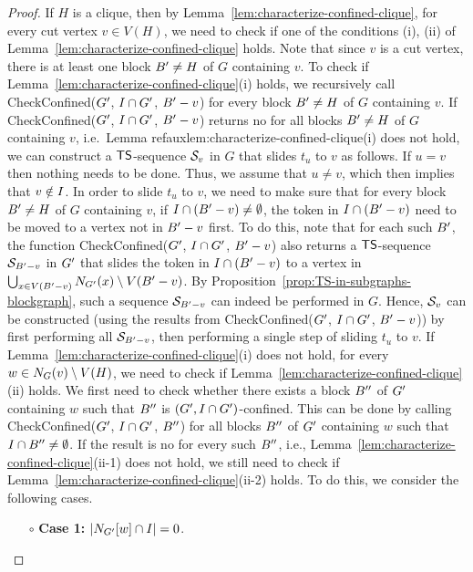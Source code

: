 \documentclass[a4paper]{llncs}
\begin{document}
\begin{proof}
If $H$ is a clique, then by Lemma~\ref{lem:characterize-confined-clique}, 
	for every cut vertex $v \in V(H)$,
	we need to check if one of the conditions (i), (ii) of Lemma~\ref{lem:characterize-confined-clique} holds.
Note that since $v$ is a cut vertex, there is at least one block $B^{\prime} \neq H$ of $G$ containing $v$.
To check if Lemma~\ref{lem:characterize-confined-clique}(i) holds, we recursively call {\sc CheckConfined}(${G^\prime}$, $I \cap {G^\prime}$, $B^{\prime} - v$) for every block $B^{\prime} \neq H$ of $G$ containing $v$.
If {\sc CheckConfined}(${G^\prime}$, $I \cap {G^\prime}$, $B^{\prime} - v$) returns {\sc no} for all blocks $B^{\prime} \neq H$ of $G$ containing $v$, i.e.~Lemma refaux{lem:characterize-confined-clique}(i) does not hold, 
	we can construct a ${\sf TS}$-sequence ${\cal S}_v$ in $G$ that slides $t_u$ to $v$ as follows.
If $u = v$ then nothing needs to be done.
Thus, we assume that $u \neq v$, which then implies that $v \notin I$.
In order to slide $t_u$ to $v$, we need to make sure that for every block $B^{\prime} \neq H$ of $G$ containing $v$, if $I \cap (B^{\prime} - v) \neq \emptyset$, 
	the token in $I \cap (B^{\prime} - v)$ need to be moved to a vertex not in $B^{\prime} - v$ first.
To do this, note that for each such $B^{\prime}$, the function {\sc CheckConfined}(${G^\prime}$, $I \cap {G^\prime}$, $B^{\prime} - v$) also returns a ${\sf TS}$-sequence ${\cal S}_{B^{\prime} - v}$ in ${G^\prime}$ that slides the token in $I \cap (B^{\prime} - v)$ to a vertex in $\bigcup_{x \in V(B^{\prime} - v)}N_{{G^\prime}}(x) \setminus V(B^{\prime} - v)$.
By Proposition~\ref{prop:TS-in-subgraphs-blockgraph}, such a sequence ${\cal S}_{B^{\prime} - v}$ can indeed be performed in $G$.
Hence, ${\cal S}_v$ can be constructed (using the results from {\sc CheckConfined}(${G^\prime}$, $I \cap {G^\prime}$, $B^{\prime} - v$)) by first performing all ${\cal S}_{B^{\prime} - v}$, then performing a single step of sliding $t_u$ to $v$.  
If Lemma~\ref{lem:characterize-confined-clique}(i) does not hold, for every $w \in N_{G}(v) \setminus V(H)$, we need to check if Lemma~\ref{lem:characterize-confined-clique}(ii) holds.
We first need to check whether there exists a block $B^{\prime\prime}$ of ${G^\prime}$ containing $w$
	such that $B^{\prime\prime}$ is $({G^\prime}, I \cap {G^\prime})$-confined.
This can be done by calling {\sc CheckConfined}(${G^\prime}$, $I \cap {G^\prime}$, $B^{\prime\prime}$) for all blocks $B^{\prime\prime}$ of ${G^\prime}$ containing $w$ such that $I \cap B^{\prime\prime} \neq \emptyset$.
If the result is {\sc no} for every such $B^{\prime\prime}$, i.e., Lemma~\ref{lem:characterize-confined-clique}(ii-1) does not hold, 
	we still need to check if  Lemma~\ref{lem:characterize-confined-clique}(ii-2) holds.
To do this, we consider the following cases.

\begin{itemize}
\item [$\circ$] \textbf{Case 1:} ${\left|N_{{G^\prime}}[w] \cap I\right|} = 0$.
\end{itemize}


\end{proof}
\end{document}
